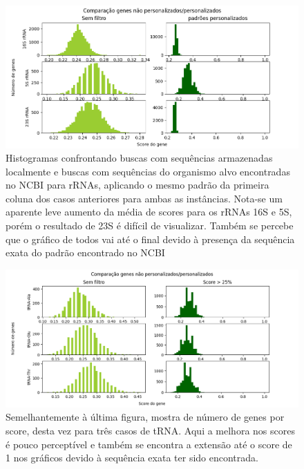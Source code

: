 \documentclass[brazilian,12pt,a4paper,final]{article}
\begin{document}
	 \vspace{0.5cm}

	\begin{figure}[hbtp]
		\begin{center}
			\includegraphics[width=15cm]{../Figures/PersonalizadosrRNA.png}
			\caption{Histogramas confrontando buscas com sequências armazenadas localmente e buscas com sequências do organismo alvo encontradas no NCBI para rRNAs, aplicando o mesmo padrão da primeira coluna dos casos anteriores para ambas as instâncias. Nota-se um aparente leve aumento da média de scores para os rRNAs 16S e 5S, porém o resultado de 23S é difícil de visualizar. Também se percebe que o gráfico de todos vai até o final devido à presença da sequência exata do padrão encontrado no NCBI }
			\label{fig}
		\end{center}
	\end{figure}
	
	\begin{figure}[hbtp]
		\begin{center}
			\includegraphics[width=15cm]{../Figures/PersonalizadostRNA.png}
			\caption{Semelhantemente à última figura, mostra de número de genes por score, desta vez para três casos de tRNA. Aqui a melhora nos scores é pouco perceptível e também se encontra a extensão até o score de 1 nos gráficos devido à sequência exata ter sido encontrada.}
			\label{fig}
		\end{center}
	\end{figure}
\end{document}
